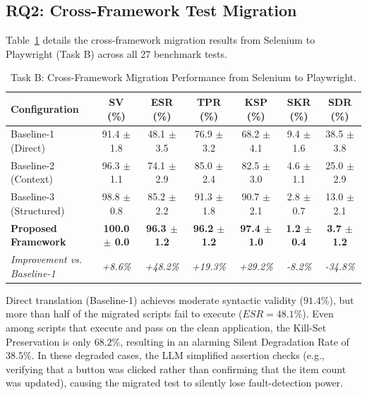 \documentclass[pdflatex,sn-mathphys-num]{sn-jnl}
\begin{document}
\subsection{RQ2: Cross-Framework Test Migration}
\label{subsec:rq2-results}

Table~\ref{tab:migration-results} details the cross-framework migration results
from Selenium to Playwright (Task B) across all 27 benchmark tests.

\begin{table}[t]
\centering
\caption{Task B: Cross-Framework Migration Performance from Selenium to Playwright.}
\label{tab:migration-results}
\small
\begin{tabular}{lcccccc}
\toprule
\textbf{Configuration} &
\textbf{SV (\%)} &
\textbf{ESR (\%)} &
\textbf{TPR (\%)} &
\textbf{KSP (\%)} &
\textbf{SKR (\%)} &
\textbf{SDR (\%)} \\
\midrule
Baseline-1 (Direct) & 91.4 $\pm$ 1.8 & 48.1 $\pm$ 3.5 & 76.9 $\pm$ 3.2 & 68.2 $\pm$ 4.1 & 9.4 $\pm$ 1.6 & 38.5 $\pm$ 3.8 \\
Baseline-2 (Context) & 96.3 $\pm$ 1.1 & 74.1 $\pm$ 2.9 & 85.0 $\pm$ 2.4 & 82.5 $\pm$ 3.0 & 4.6 $\pm$ 1.1 & 25.0 $\pm$ 2.9 \\
Baseline-3 (Structured) & 98.8 $\pm$ 0.8 & 85.2 $\pm$ 2.2 & 91.3 $\pm$ 1.8 & 90.7 $\pm$ 2.1 & 2.8 $\pm$ 0.7 & 13.0 $\pm$ 2.1 \\
\textbf{Proposed Framework} & \textbf{100.0 $\pm$ 0.0} & \textbf{96.3 $\pm$ 1.2} & \textbf{96.2 $\pm$ 1.2} & \textbf{97.4 $\pm$ 1.0} & \textbf{1.2 $\pm$ 0.4} & \textbf{3.7 $\pm$ 1.2} \\
\midrule
\textit{Improvement vs. Baseline-1} & \textit{+8.6\%} & \textit{+48.2\%} & \textit{+19.3\%} & \textit{+29.2\%} & \textit{-8.2\%} & \textit{-34.8\%} \\
\bottomrule
\end{tabular}
\end{table}

Direct translation (Baseline-1) achieves moderate syntactic validity ($91.4\%$),
but more than half of the migrated scripts fail to execute ($ESR = 48.1\%$). Even among
scripts that execute and pass on the clean application, the Kill-Set Preservation
is only $68.2\%$, resulting in an alarming Silent Degradation Rate of $38.5\%$. In
these degraded cases, the LLM simplified assertion checks (e.g., verifying that a
button was clicked rather than confirming that the item count was updated), causing
the migrated test to silently lose fault-detection power.
\end{document}
